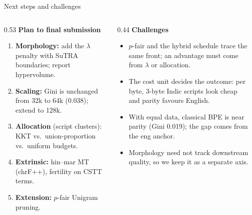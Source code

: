 \documentclass[aspectratio=169,10pt]{beamer}
\begin{document}
\begin{frame}{Next steps and challenges}
\begin{columns}[T,onlytextwidth]
\begin{column}{0.53\textwidth}
\textbf{\color{iitbblue}Plan to final submission}
\begin{enumerate}\setlength{\itemsep}{4pt}
  \item \textbf{Morphology:} add the $\lambda$ penalty with SuTRA boundaries; report hypervolume.
  \item \textbf{Scaling:} Gini is unchanged from 32k to 64k (0.038); extend to 128k.
  \item \textbf{Allocation} (script clusters): KKT vs.\ union-proportion vs.\ uniform budgets.
  \item \textbf{Extrinsic:} hin--mar MT (chrF++), fertility on CSTT terms.
  \item \textbf{Extension:} $p$-fair Unigram pruning.
\end{enumerate}
\end{column}
\begin{column}{0.44\textwidth}
\textbf{\color{iitbblue}Challenges}
\begin{itemize}\setlength{\itemsep}{4pt}
  \item $p$-fair and the hybrid schedule trace the same front; an advantage must come from $\lambda$ or allocation.
  \item The cost unit decides the outcome: per byte, 3-byte Indic scripts look cheap and parity favours English.
  \item With equal data, classical BPE is near parity (Gini 0.019); the gap comes from the eng anchor.
  \item Morphology need not track downstream quality, so we keep it as a separate axis.
\end{itemize}
\end{column}
\end{columns}
\vskip10pt
\end{frame}
\end{document}
